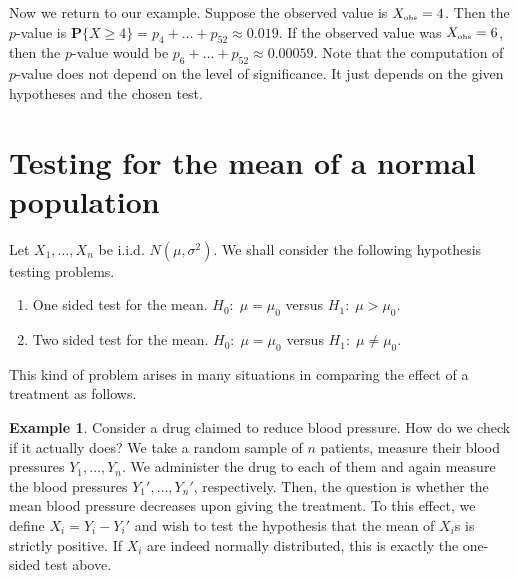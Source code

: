 \documentclass[preprint,  11pt]{amsart}
\theoremstyle{plain} %
\theoremstyle{definition} %
\newtheorem{example}[theorem]{Example}
\begin{document}
Now we return to our example. Suppose the observed value is $X_{\mbox{\tiny obs}}=4$. Then the $p$-value is $\mathbf{P}\{X\ge 4\}=p_{4}+\ldots +p_{52}\approx 0.019$. If the observed value was $X_{\mbox{\tiny obs}}=6$, then the $p$-value would be $p_{6}+\ldots +p_{52}\approx 0.00059$. Note that the computation of $p$-value does not depend on the level of significance. It just depends on the given hypotheses and the chosen test. 


\section{Testing for the mean of a normal population}
 Let $X_{1},\ldots ,X_{n}$ be i.i.d. $N(\mu,{\sigma}^{2})$. We shall consider the following  hypothesis testing problems.

\begin{enumerate}\setlength\itemsep{6pt}
\item One sided test for the mean. $H_{0}:\; \mu=\mu_{0}$ versus $H_{1}: \; \mu>\mu_{0}$.
\item Two sided test for the mean.  $H_{0}:\; \mu=\mu_{0}$ versus $H_{1}: \; \mu\not=\mu_{0}$.
\end{enumerate}
This kind of problem arises in many situations in comparing the effect of a treatment as follows. 
\begin{example} Consider a drug claimed to reduce blood pressure. How do we check if it actually does? We take a random sample of $n$ patients, measure their blood pressures $Y_{1},\ldots ,Y_{n}$. We administer the drug to each of them and again measure the blood pressures $Y_{1}',\ldots ,Y_{n}'$, respectively.   Then, the question is whether the mean blood pressure decreases upon giving the treatment. To this effect, we define $X_{i}=Y_{i}-Y_{i}'$ and wish to test the hypothesis that the mean of $X_{i}$s is strictly positive. If $X_{i}$ are indeed normally distributed, this is exactly the one-sided test above. 
\end{example}
\end{document}
